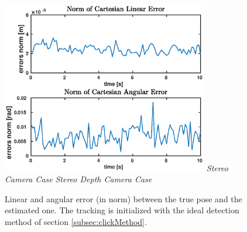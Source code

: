 \begin{figure}
{		\includegraphics[width=9cm]{tracking/click-depth.eps}
	}
	\hspace*{20px}\textit{Stereo Camera Case} \hspace{135px} \textit{Stereo Depth Camera Case}\\
	\vspace{30px}
	\caption[Tracking error plots with ideal detection initialization]{Linear and angular error (in norm) between the true pose and the estimated one. The tracking is initialized with the ideal detection method of section \ref{subsec:clickMethod}.}
	\label{fig:clickErrors}
\end{figure}

